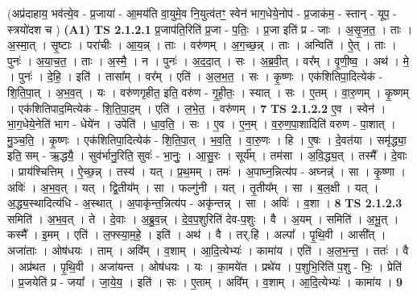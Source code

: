\documentclass[17pt]{extarticle}
\begin{document}
                      (अप्र॑दाहाय॒ भव॑त्ये॒व - प्र॒जाया॑ - आ॒मय॑ति वा॒युमे॒व नि॒युत्व॑तꣳ॒॒ स्वेन॑ भाग॒धेये॒नोप॑ - प्र॒जाक॑म॒ - स्तान् - यूप॒ - स्त्रयो॑दश च )  \textbf{(A1)} \newline \newline
                                \textbf{ TS 2.1.2.1} \newline
                  प्र॒जाप॑ति॒रिति॑ प्र॒जा - प॒तिः॒ । प्र॒जा इति॑ प्र - जाः । अ॒सृ॒ज॒त॒ । ताः । अ॒स्मा॒त् । सृ॒ष्टाः । परा॑चीः । आ॒य॒न्न् । ताः । वरु॑णम् । अ॒ग॒च्छ॒न्न् । ताः । अन्विति॑ । ऐ॒त् । ताः । पुनः॑ । अ॒या॒च॒त॒ । ताः । अ॒स्मै॒ । न । पुनः॑ । अ॒द॒दा॒त् । सः । अ॒ब्र॒वी॒त् । वर᳚म् । वृ॒णी॒ष्व॒ । अथ॑ । मे॒ । पुनः॑ । दे॒हि॒ । इति॑ । तासा᳚म् । वर᳚म् । एति॑ । अ॒ल॒भ॒त॒ । सः । कृ॒ष्णः । एक॑शितिपा॒दित्येक॑ - शि॒ति॒पा॒त् । अ॒भ॒व॒त् । यः । वरु॑णगृहीत॒ इति॒ वरु॑ण - गृ॒ही॒तः॒ । स्यात् । सः । ए॒तम् । वा॒रु॒णम् । कृ॒ष्णम् । एक॑शितिपाद॒मित्येक॑ - शि॒ति॒पा॒द॒म् । एति॑ । ल॒भे॒त॒ । वरु॑णम् । \textbf{  7 } \newline
                  \newline
                                \textbf{ TS 2.1.2.2} \newline
                  ए॒व । स्वेन॑ । भा॒ग॒धेये॒नेति॑ भाग - धेये॑न । उपेति॑ । धा॒व॒ति॒ । सः । ए॒व । ए॒न॒म् । व॒रु॒ण॒पा॒शादिति॑ वरुण - पा॒शात् । मु॒ञ्च॒ति॒ । कृ॒ष्णः । एक॑शितिपा॒दित्येक॑ - शि॒ति॒पा॒त् । भ॒व॒ति॒ । वा॒रु॒णः । हि । ए॒षः । दे॒वत॑या । समृ॑द्ध्या॒ इति॒ सम् - ऋ॒द्धयै॒ । सुव॑र्भानु॒रिति॒ सुवः॑ - भा॒नुः॒ । आ॒सु॒रः । सूर्य᳚म् । तम॑सा । अ॒वि॒द्ध्य॒त् । तस्मै᳚ । दे॒वाः । प्राय॑श्चित्तिम् । ऐ॒च्छ॒न्न् । तस्य॑ । यत् । प्र॒थ॒मम् । तमः॑ । अ॒पाघ्न॒न्नित्य॑प - अघ्नन्न्॑ । सा । कृ॒ष्णा । अविः॑ । अ॒भ॒व॒त् । यत् । द्वि॒तीय᳚म् । सा । फल्गु॑नी । यत् । तृ॒तीय᳚म् । सा । ब॒ल॒क्षी । यत् । अ॒द्ध्य॒स्थादित्य॑धि - अ॒स्थात् । अ॒पाकृ॑न्त॒न्नित्य॑प - अकृ॑न्तन्न् । सा । अविः॑ । व॒शा । \textbf{  8} \newline
                  \newline
                                \textbf{ TS 2.1.2.3} \newline
                  समिति॑ । अ॒भ॒व॒त् । ते । दे॒वाः । अ॒ब्रु॒व॒न्न् । दे॒व॒प॒शुरिति॑ देव-प॒शुः । वै । अ॒यम् । समिति॑ । अ॒भू॒त् । कस्मै᳚ । इ॒मम् । एति॑ । ल॒फ्स्या॒म॒हे॒ । इति॑ । अथ॑ । वै । तर्.हि॑ । अल्पा᳚ । पृ॒थि॒वी । आसी᳚त् । अजा॑ताः । ओष॑धयः । ताम् । अवि᳚म् । व॒शाम् । आ॒दि॒त्येभ्यः॑ । कामा॑य । एति॑ । अ॒ल॒भ॒न्त॒ । ततः॑ । वै । अप्र॑थत । पृ॒थि॒वी । अजा॑यन्त । ओष॑धयः । यः । का॒मये॑त । प्रथे॑य । प॒शुभि॒रिति॑ प॒शु - भिः॒ । प्रेति॑ । प्र॒जयेति॑ प्र - जया᳚ । जा॒ये॒य॒ । इति॑ । सः । ए॒ताम् । अवि᳚म् । व॒शाम् । आ॒दि॒त्येभ्यः॑ । कामा॑य । \textbf{  9} \newline
\end{document}
